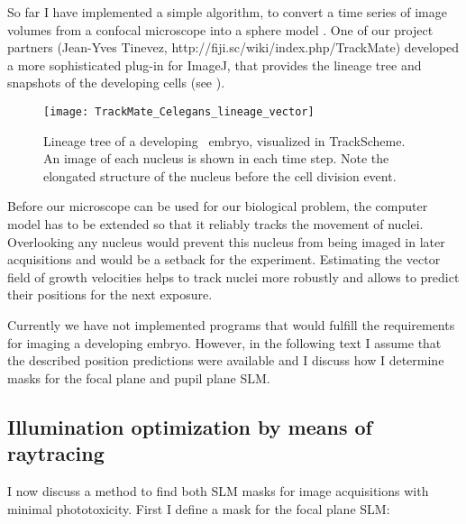 So far I have implemented a simple algorithm, to convert a time series
of image volumes from a confocal microscope into a sphere model
\citep{Santella2010}.  One of our project partners (Jean-Yves Tinevez,
http://fiji.sc/wiki/index.php/TrackMate) developed a more
sophisticated plug-in for ImageJ, that provides the lineage tree and
snapshots of the developing cells (see ).
\begin{figure}[!hbt] \centering
  \qquad
  \texttt{[image: TrackMate\_Celegans\_lineage\_vector]} 
  \caption{Lineage tree of a developing \celegans\ embryo, visualized
    in TrackScheme. An image of each nucleus is shown in each time
    step. Note the elongated structure of the nucleus before the cell
    division event.}
  \label{fig:trackmate}
\end{figure} Before our microscope can be used for our biological
problem, the computer model has to be extended so that it reliably
tracks the movement of nuclei.  Overlooking any nucleus would prevent
this nucleus from being imaged in later acquisitions and would be a
setback for the experiment.  Estimating the vector field of growth
velocities helps to track nuclei more robustly and allows to predict
their positions for the next exposure.

Currently we have not implemented programs that would fulfill the
requirements for imaging a developing embryo.  However, in the
following text I assume that the described position predictions were
available and I discuss how I determine masks for the focal plane and
pupil plane SLM.





\subsection{Illumination optimization by means of raytracing} 
\label{sec:illum-opt}
I now discuss a method to find both SLM masks for image acquisitions
with minimal phototoxicity. First I define a mask for the focal plane
SLM:


